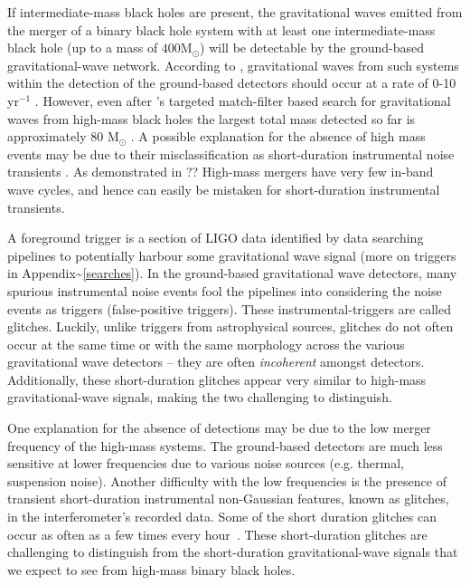 \documentclass[%
 reprint,
 amsmath,amssymb,
 aps,
]{revtex4}
\begin{document}
If intermediate-mass black holes are present, the gravitational waves emitted from the merger of a binary black hole system with at least one intermediate-mass black hole (up to a mass of $400 \text{M}_\odot$) will be detectable by the ground-based gravitational-wave network. According to \citet{fregeau2006imbhbRatePrediction, mandel2008rates,rodriguez2015bbhRatePredictions}, gravitational waves from such systems within the detection of the ground-based detectors should occur at a rate of 0-10 yr\(^{-1}\) .  However, even after \citet{salemi2019search}'s
targeted match-filter based search for gravitational waves from high-mass black holes the largest total mass detected so
far is approximately 80 M\({}_\odot\) \cite{abbott2019gwtc}. A possible explanation for the absence of high mass events may be
due to their misclassification as short-duration instrumental noise transients \cite{blipGlitches}. As demonstrated in ?? High-mass mergers have
very few in-band wave cycles, and hence can easily be mistaken for short-duration instrumental transients.




A foreground trigger is a section of LIGO data identified by data searching pipelines to potentially harbour some
gravitational wave signal (more on triggers in Appendix\textasciitilde\ref{searches}). In the ground-based gravitational wave
detectors, many spurious instrumental noise events fool the pipelines into considering the noise events as triggers
(false-positive triggers). These instrumental-triggers are called glitches. Luckily, unlike triggers from astrophysical
sources, glitches do not often occur at the same time or with the same morphology across the various gravitational wave
detectors -- they are often \emph{incoherent} amongst detectors. Additionally, these short-duration glitches appear very
similar to high-mass gravitational-wave signals, making the two challenging to distinguish.


One explanation for the absence of detections may be due to the low merger frequency of the high-mass systems. The ground-based detectors are much less sensitive at lower frequencies due to various noise sources (e.g. thermal, suspension noise). Another difficulty with the low frequencies is the presence of transient short-duration instrumental non-Gaussian features, known as glitches, in the interferometer's recorded data. Some of the short duration glitches can occur as often as a few times every hour~\cite{blipGlitches}. These short-duration glitches are challenging to distinguish from the short-duration gravitational-wave signals that we expect to see from high-mass binary black holes. 
\end{document}
